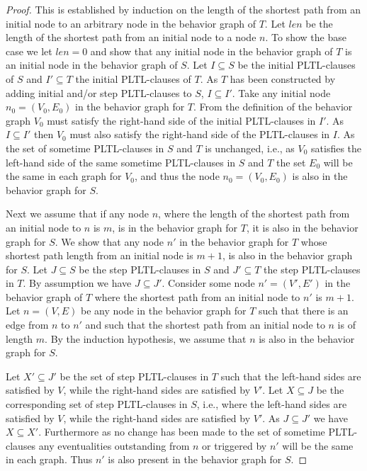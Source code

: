 \documentclass[nohyperref]{acmtrans2f}
\begin{document}
\begin{proof}
This is established by
induction on the length of the shortest path from an initial node to 
an arbitrary node in the behavior graph of $T$. Let $len$ be the length of the
shortest path from an  initial node to a node $n$. To show the base case we
let $len =0$ and show that any initial node in the behavior
graph of $T$ is an initial node in the behavior graph of $S$. 
Let $I \subseteq S$ be the initial PLTL-clauses of $S$ and $I' \subseteq T$ the
initial PLTL-clauses of $T$. As $T$ has been constructed by adding initial and/or
step  PLTL-clauses to $S$, $I \subseteq I'$. Take any initial node
$n_0 = (V_0,E_0)$ in the behavior graph for $T$. From the
definition of the 
behavior graph $V_0$ must satisfy the right-hand side of the initial PLTL-clauses in
$I'$. As $I \subseteq I'$ then $V_0$ must also satisfy the 
right-hand side of the PLTL-clauses in $I$. As the set of sometime PLTL-clauses in
$S$ and $T$ is unchanged, i.e., as $V_0$ satisfies the left-hand side of the
same sometime PLTL-clauses in $S$ and $T$ the set $E_0$ will be the same in each
graph for $V_0$, and thus the node $n_0 = (V_0,E_0)$ is also in the
behavior graph for $S$.

Next we assume that if any node $n$,  where the length of the shortest
path from an initial node to $n$ is $m$, is
in the behavior  graph for $T$, it is also in the behavior graph for $S$.
We show that any node $n'$ in the behavior  graph for $T$ whose shortest
path length from an initial node is $m+1$,  is also in the behavior graph for
$S$. 
%
Let $J \subseteq S$ be the step PLTL-clauses in $S$ and $J' \subseteq T$ the
step PLTL-clauses in $T$. By assumption we have $J \subseteq J'$.
Consider some node $n' = (V',E')$ in the behavior graph of $T$ where the shortest
path from an initial node to $n'$ is $m+1$. Let $n = (V,E)$ be any node in
the behavior graph for $T$ such that there is an edge from $n$ to $n'$ and
such that the shortest path from an initial node to $n$ is of length $m$.
%
By the induction hypothesis, we assume that $n$ is also in the
behavior graph for $S$.

Let $X' \subseteq J'$ be the set of step PLTL-clauses in $T$ such that the
left-hand sides are satisfied by $V$, while the right-hand sides are
satisfied by $V'$. 
Let $X \subseteq J$ be the corresponding set of step PLTL-clauses in $S$,
i.e., where the left-hand sides are satisfied by $V$, while the right-hand
sides are satisfied by $V'$. 
As $J \subseteq J'$  we have $X \subseteq X'$.
Furthermore as no change has
been made to the set of sometime PLTL-clauses any eventualities outstanding
from $n$ or triggered by $n'$ will be the same in each graph. Thus $n'$ is
also present in the behavior graph for $S$.
\end{proof}
\end{document}
